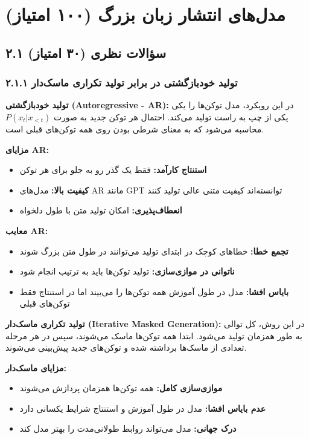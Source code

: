 \documentclass[12pt,a4paper]{article}
\theoremstyle{definition}
\begin{document}
\newpage

\section{\textbf{مدل‌های انتشار زبان بزرگ (۱۰۰ امتیاز)}}

\subsection{۲.۱ سؤالات نظری (۳۰ امتیاز)}

\subsubsection*{۲.۱.۱ تولید خودبازگشتی در برابر تولید تکراری ماسک‌دار}

\textbf{تولید خودبازگشتی (Autoregressive - AR):}
در این رویکرد، مدل توکن‌ها را یکی یکی از چپ به راست تولید می‌کند. احتمال هر توکن جدید به صورت $P(x_t | x_{<t})$ محاسبه می‌شود که به معنای شرطی بودن روی همه توکن‌های قبلی است.

\textbf{مزایای AR:}
\begin{itemize}
    \item \textbf{استنتاج کارآمد:} فقط یک گذر رو به جلو برای هر توکن
    \item \textbf{کیفیت بالا:} مدل‌های AR مانند GPT توانسته‌اند کیفیت متنی عالی تولید کنند
    \item \textbf{انعطاف‌پذیری:} امکان تولید متن با طول دلخواه
\end{itemize}

\textbf{معایب AR:}
\begin{itemize}
    \item \textbf{تجمع خطا:} خطاهای کوچک در ابتدای تولید می‌توانند در طول متن بزرگ شوند
    \item \textbf{ناتوانی در موازی‌سازی:} تولید توکن‌ها باید به ترتیب انجام شود
    \item \textbf{بایاس افشا:} مدل در طول آموزش همه توکن‌ها را می‌بیند اما در استنتاج فقط توکن‌های قبلی
\end{itemize}

\textbf{تولید تکراری ماسک‌دار (Iterative Masked Generation):}
در این روش، کل توالی به طور همزمان تولید می‌شود. ابتدا همه توکن‌ها ماسک می‌شوند، سپس در هر مرحله تعدادی از ماسک‌ها برداشته شده و توکن‌های جدید پیش‌بینی می‌شوند.

\textbf{مزایای ماسک‌دار:}
\begin{itemize}
    \item \textbf{موازی‌سازی کامل:} همه توکن‌ها همزمان پردازش می‌شوند
    \item \textbf{عدم بایاس افشا:} مدل در طول آموزش و استنتاج شرایط یکسانی دارد
    \item \textbf{درک جهانی:} مدل می‌تواند روابط طولانی‌مدت را بهتر مدل کند
\end{itemize}
\end{document}
